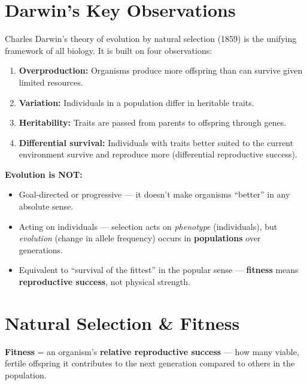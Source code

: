 \documentclass[11pt, letterpaper]{article}
\begin{document}
\vspace{8pt}

\section*{Darwin's Key Observations}

Charles Darwin's theory of evolution by natural selection (1859) is the unifying framework of
all biology. It is built on four observations:
\begin{enumerate}[noitemsep]
  \item \textbf{Overproduction:} Organisms produce more offspring than can survive given limited resources.
  \item \textbf{Variation:} Individuals in a population differ in heritable traits.
  \item \textbf{Heritability:} Traits are passed from parents to offspring through genes.
  \item \textbf{Differential survival:} Individuals with traits better suited to the current
        environment survive and reproduce more (differential reproductive success).
\end{enumerate}

\begin{tcolorbox}[colback=part2bg, colframe=sectiongreen, arc=3pt, boxrule=1pt]
\textbf{Evolution is NOT:}
\begin{itemize}[noitemsep, leftmargin=*]
  \item Goal-directed or progressive --- it doesn't make organisms ``better'' in any absolute sense.
  \item Acting on individuals --- selection acts on \emph{phenotype} (individuals), but
        \emph{evolution} (change in allele frequency) occurs in \textbf{populations} over generations.
  \item Equivalent to ``survival of the fittest'' in the popular sense --- \textbf{fitness} means
        \textbf{reproductive success}, not physical strength.
\end{itemize}
\end{tcolorbox}

\section*{Natural Selection \& Fitness}

\textbf{Fitness} = an organism's \textbf{relative reproductive success} --- how many viable,
fertile offspring it contributes to the next generation compared to others in the population.
\end{document}
